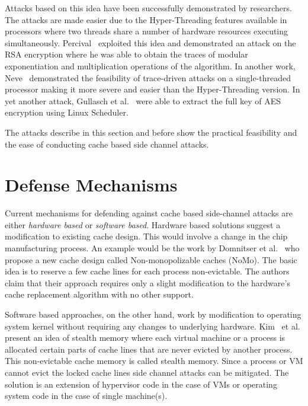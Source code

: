 \documentclass[onecolumn]{IEEEtran}
\begin{document}
Attacks based on this idea have been successfully demonstrated by
researchers.  The attacks are made easier due to the Hyper-Threading
features available in processors where two threads share a number of
hardware resources executing simultaneously.
Percival~\cite{percival2005cache} exploited this idea and demonstrated
an attack on the RSA encryption where he was able to obtain the traces
of modular exponentiation and multiplication operations of the
algorithm.  In another work, Neve~\cite{neve2006advances} demonstrated
the feasibility of trace-driven attacks on a single-threaded processor
making it more severe and easier than the Hyper-Threading version.  In
yet another attack, Gullasch et al.~\cite{gullasch2011cache} were able
to extract the full key of AES encryption using Linux Scheduler.

The attacks describe in this section and before show the practical
feasibility and the ease of conducting cache based side channel
attacks.

\section{Defense Mechanisms}

Current mechanisms for defending against cache based side-channel
attacks are either {\it hardware based} or {\it software based}.
Hardware based solutions suggest a modification to existing cache
design.  This would involve a change in the chip manufacturing
process.  An example would be the work by Domnitser et
al.~\cite{domnitser2012non} who propose a new cache design called
Non-monopolizable caches (NoMo).  The basic idea is to reserve a
few cache lines for each process non-evictable.  The authors claim
that their approach requires only a slight modification to the
hardware's cache replacement algorithm with no other support.

Software based approaches, on the other hand, work by modification to
operating system kernel without requiring any changes to underlying
hardware.  Kim~\cite{kim2012stealthmem} et al. present an idea of
stealth memory where each virtual machine or a process is allocated
certain parts of cache lines that are never evicted by another
process.  This non-evictable cache memory is called stealth memory.
Since a process or VM cannot evict the locked cache lines side channel
attacks can be mitigated.  The solution is an extension of hypervisor
code in the case of VMs or operating system code in the case of single
machine(s).
\end{document}
